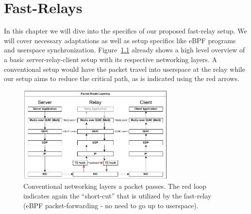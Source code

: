 
\chapter{Fast-Relays}\label{chap:fast_relays}

In this chapter we will dive into the specifics of our proposed fast-relay setup.
We will cover necessary adaptations as well as setup specifics like eBPF programs 
and userspace synchronization.
Figure~\ref{fig:route-layering} already shows a high level overview of a basic 
server-relay-client setup with its respective networking layers.
A conventional setup would have the packet travel into userspace at the relay
while our setup aims to reduce the critical path, as is indicated using the red arrows.

\vspace{0.5cm}
\begin{figure}[htbp] %
    \centering
    \includegraphics[width=0.7\textwidth]{figures/02_background/route-layering.drawio.pdf}
    \caption[Packet path schematic regarding network stack]{Conventional networking layers a packet passes.
    The red loop indicates again the ``short-cut'' that is utilized by the fast-relay 
    (eBPF packet-forwarding {-} no need to go up to userspace).}\label{fig:route-layering}
\end{figure}







